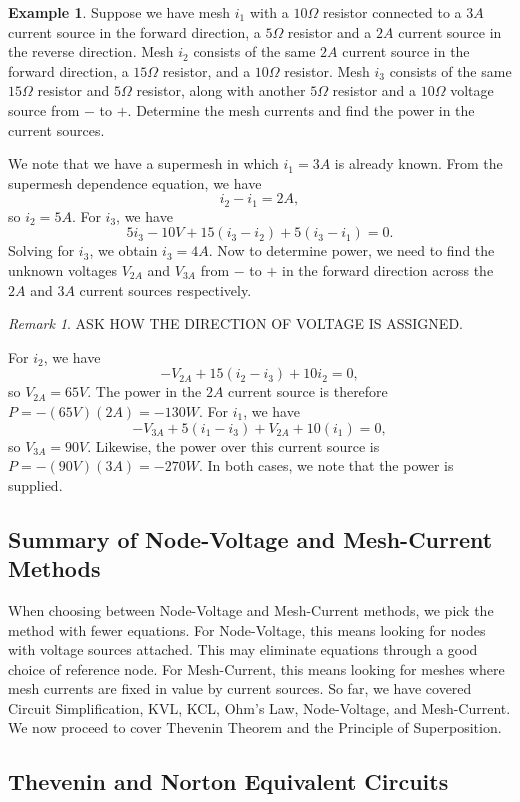 \documentclass[11pt]{article}
\theoremstyle{plain} %
\theoremstyle{definition}
\theoremstyle{example}
\newtheorem*{example}{Example}
\theoremstyle{remark}
\newtheorem*{remark}{Remark}
\begin{document}
\begin{example}Suppose we have mesh $i_1$ with a $10\Omega$ resistor connected to a $3A$ current source in the forward direction, a $5\Omega$ resistor and a $2A$ current source in the reverse direction.  Mesh $i_2$ consists of the same $2A$ current source in the forward direction, a $15\Omega$ resistor, and a $10\Omega$ resistor. Mesh $i_3$ consists of the same $15\Omega $ resistor and $5\Omega$ resistor, along with another $5\Omega$ resistor and a $10\Omega$ voltage source from $-$ to $+$. Determine the mesh currents and find the power in the current sources. 
\end{example}

We note that we have a supermesh in which $i_1=3A$ is already known. From the supermesh dependence equation, we have 
$$i_2-i_1=2A,$$
so $i_2=5A$. For $i_3$, we have 
$$5i_3 -10V+15(i_3-i_2) + 5(i_3-i_1) = 0.$$
Solving for $i_3$, we obtain $i_3=4A$. 
Now to determine power, we need to find the unknown voltages $V_{2A}$ and $V_{3A}$ from $-$ to $+$ in the forward direction across the $2A$ and $3A$ current sources respectively. 
\begin{remark}
ASK HOW THE DIRECTION OF VOLTAGE IS ASSIGNED.
\end{remark}
For $i_2$, we have $$-V_{2A} + 15(i_2-i_3)+10i_2 = 0,$$
so $V_{2A} = 65V$. The power in the $2A$ current source is therefore $P = -(65V)(2A) =-130W$. 
For $i_1$, we have $$-V_{3A} + 5(i_1-i_3) + V_{2A} + 10(i_1) = 0,$$
so $V_{3A} = 90V$. Likewise, the power over this current source is $P = -(90V)(3A) = -270W$. 
In both cases, we note that the power is supplied. 

\subsection{Summary of Node-Voltage and Mesh-Current Methods}

When choosing between Node-Voltage and Mesh-Current methods, we pick the method with fewer equations. For Node-Voltage, this means looking for nodes with voltage sources attached. This may eliminate equations through a good choice of reference node. For Mesh-Current, this means looking for meshes where mesh currents are fixed in value by current sources. So far, we have covered Circuit Simplification, KVL, KCL, Ohm's Law, Node-Voltage, and Mesh-Current. We now proceed to cover Thevenin Theorem and the Principle of Superposition. 

\subsection{Thevenin and Norton Equivalent Circuits}
\end{document}

